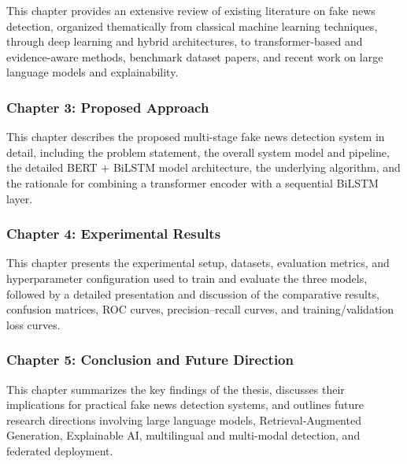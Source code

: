 This chapter provides an extensive review of existing literature on fake news detection, organized thematically from classical machine learning techniques, through deep learning and hybrid architectures, to transformer-based and evidence-aware methods, benchmark dataset papers, and recent work on large language models and explainability.

\subsubsection*{Chapter 3: Proposed Approach}

This chapter describes the proposed multi-stage fake news detection system in detail, including the problem statement, the overall system model and pipeline, the detailed BERT + BiLSTM model architecture, the underlying algorithm, and the rationale for combining a transformer encoder with a sequential BiLSTM layer.

\subsubsection*{Chapter 4: Experimental Results}

This chapter presents the experimental setup, datasets, evaluation metrics, and hyperparameter configuration used to train and evaluate the three models, followed by a detailed presentation and discussion of the comparative results, confusion matrices, ROC curves, precision--recall curves, and training/validation loss curves.

\subsubsection*{Chapter 5: Conclusion and Future Direction}

This chapter summarizes the key findings of the thesis, discusses their implications for practical fake news detection systems, and outlines future research directions involving large language models, Retrieval-Augmented Generation, Explainable AI, multilingual and multi-modal detection, and federated deployment.
